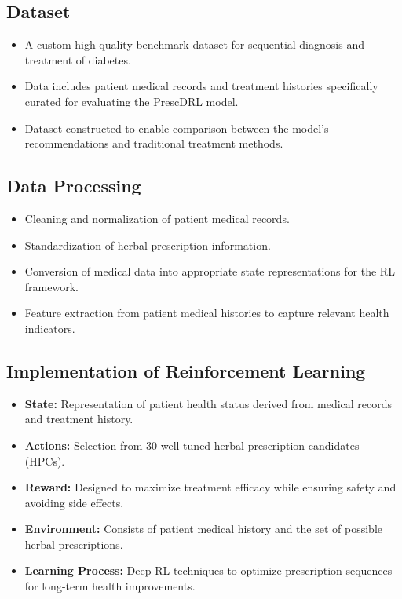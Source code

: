 \subsection*{Dataset}
\begin{itemize}
    \item A custom high-quality benchmark dataset for sequential diagnosis and treatment of diabetes.
    \item Data includes patient medical records and treatment histories specifically curated for evaluating the PrescDRL model.
    \item Dataset constructed to enable comparison between the model's recommendations and traditional treatment methods.
\end{itemize}

\subsection*{Data Processing}
\begin{itemize}
    \item Cleaning and normalization of patient medical records.
    \item Standardization of herbal prescription information.
    \item Conversion of medical data into appropriate state representations for the RL framework.
    \item Feature extraction from patient medical histories to capture relevant health indicators.
\end{itemize}

\subsection*{Implementation of Reinforcement Learning}
\begin{itemize}
    \item \textbf{State:} Representation of patient health status derived from medical records and treatment history.
    \item \textbf{Actions:} Selection from 30 well-tuned herbal prescription candidates (HPCs).
    \item \textbf{Reward:} Designed to maximize treatment efficacy while ensuring safety and avoiding side effects.
    \item \textbf{Environment:} Consists of patient medical history and the set of possible herbal prescriptions.
    \item \textbf{Learning Process:} Deep RL techniques to optimize prescription sequences for long-term health improvements.
\end{itemize}

